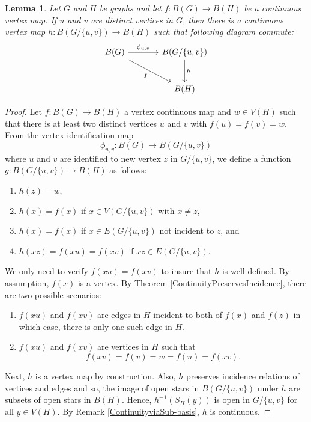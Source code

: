 \documentclass{amsart}
\newtheorem{lemma}[theorem]{Lemma}
\theoremstyle{definition}
\theoremstyle{remark}
\numberwithin{equation}{section}
\begin{document}
	\begin{lemma}
		\label{ContinuousVertexMapsFactorization}
		Let \(G\) and \(H\) be graphs and let \(f:B(G) \rightarrow B(H)\) be a continuous vertex map. If \(u\) and \(v\) are distinct vertices in \(G\), then there is a continuous vertex map \(h:B(G/\{u,v\}) \rightarrow B(H)\) such that following diagram commute:
		\[
		\begin{tikzcd}[column sep=large, row sep=large]
			B(G) \arrow[r, "\phi_{u,v}"] \arrow[rd, "f"'] & B(G/\{u,v\}) \arrow[d, "h"] \\
			& B(H)
		\end{tikzcd}
		\]
	\end{lemma}
	\begin{proof}
		Let \(f:B(G) \rightarrow B(H)\) a vertex continuous map and \(w \in V(H)\) such that there is at least two distinct vertices \(u\) and \(v\) with \(f(u) = f(v) = w\). From the vertex-identification map
		\[\phi_{u,v}: B(G) \rightarrow B(G/\{u,v\})\]
		where \(u\) and \(v\) are identified to new vertex \(z\) in \(G/\{u,v\}\), we define a function \(g:B(G/\{u,v\}) \rightarrow B(H)\) as follows:
		\begin{enumerate}
			\item \(h(z) = w\),
			\item \(h(x) = f(x)\) if \(x \in V(G/\{u,v\})\) with \(x \neq z\),
			\item \(h(x) = f(x)\) if \(x \in E(G/\{u,v\})\) not incident to \(z\), and
			\item \(h(xz) = f(xu)=f(xv)\) if \(xz \in E(G/\{u,v\})\).
		\end{enumerate}
		We only need to verify \(f(xu)=f(xv)\) to insure that \(h\) is well-defined. By assumption, \(f(x)\) is a vertex. By Theorem \ref{ContinuityPreservesIncidence}, there are two possible scenarios: \begin{enumerate}
			\item \(f(xu)\) and \(f(xv)\) are edges in \(H\) incident to both of \(f(x)\) and \(f(z)\) in which case, there is only one such edge in \(H\).
			\item \(f(xu)\) and \(f(xv)\) are vertices in \(H\) such that
			\[f(xv) = f(v) = w = f(u) = f(xv).\]
		\end{enumerate}
		
		Next, \(h\) is a vertex map by construction. Also, \(h\) preserves incidence relations of vertices and edges and so, the image of open stars in \(B(G/\{u,v\})\) under \(h\) are subsets of open stars in \(B(H)\). Hence, \(h^{-1}(S_{H}(y))\) is open in \(G/\{u,v\}\) for all \(y \in V(H)\). By Remark \ref{ContinuityviaSub-basis}, \(h\) is continuous.
		

\end{proof}
\end{document}
